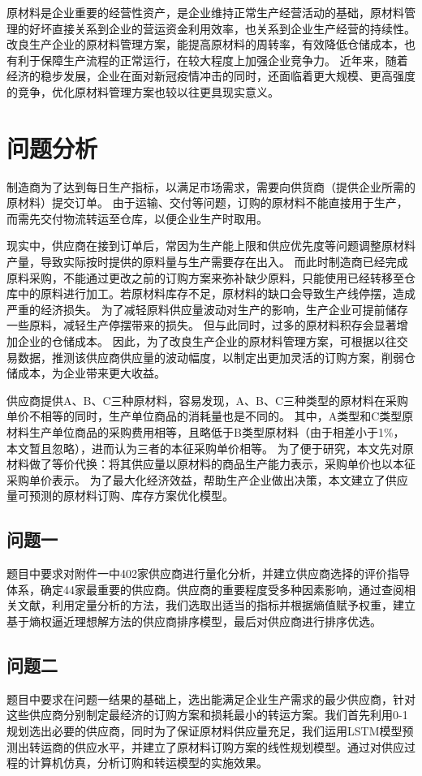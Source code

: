 
原材料是企业重要的经营性资产，是企业维持正常生产经营活动的基础，原材料管理的好坏直接关系到企业的营运资金利用效率，也关系到企业生产经营的持续性\cite{杨庆军2012浅谈}。
改良生产企业的原材料管理方案，能提高原材料的周转率，有效降低仓储成本，也有利于保障生产流程的正常运行，在较大程度上加强企业竞争力\cite{李红燕2018论企业原材料的管理和研究}。
近年来，随着经济的稳步发展，企业在面对新冠疫情冲击的同时，还面临着更大规模、更高强度的竞争，优化原材料管理方案也较以往更具现实意义。%

\section{问题分析}
制造商为了达到每日生产指标，以满足市场需求，需要向供货商（提供企业所需的原材料）提交订单。
由于运输、交付等问题，订购的原材料不能直接用于生产，而需先交付物流转运至仓库，以便企业生产时取用。

现实中，供应商在接到订单后，常因为生产能上限和供应优先度等问题调整原材料产量，导致实际按时提供的原料量与生产需要存在出入。
而此时制造商已经完成原料采购，不能通过更改之前的订购方案来弥补缺少原料，只能使用已经转移至仓库中的原料进行加工。若原材料库存不足，原材料的缺口会导致生产线停摆，造成严重的经济损失。
为了减轻原料供应量波动对生产的影响，生产企业可提前储存一些原料，减轻生产停摆带来的损失。
但与此同时，过多的原材料积存会显著增加企业的仓储成本。
因此，为了改良生产企业的原材料管理方案，可根据以往交易数据，推测该供应商供应量的波动幅度，以制定出更加灵活的订购方案，削弱仓储成本，为企业带来更大收益。

供应商提供A、B、C三种原材料，容易发现，A、B、C三种类型的原材料在采购单价不相等的同时，生产单位商品的消耗量也是不同的。
其中，A类型和C类型原材料生产单位商品的采购费用相等，且略低于B类型原材料（由于相差小于1\%，本文暂且忽略），进而认为三者的本征采购单价相等。
为了便于研究，本文先对原材料做了等价代换：将其供应量以原材料的商品生产能力表示，采购单价也以本征采购单价表示。
为了最大化经济效益，帮助生产企业做出决策，本文建立了供应量可预测的原材料订购、库存方案优化模型。

\subsection{问题一}
题目中要求对附件一中402家供应商进行量化分析，并建立供应商选择的评价指导体系，确定44家最重要的供应商。供应商的重要程度受多种因素影响，通过查阅相关文献，利用定量分析的方法，我们选取出适当的指标并根据熵值赋予权重，建立基于熵权逼近理想解方法的供应商排序模型，最后对供应商进行排序优选。


\subsection{问题二}
题目中要求在问题一结果的基础上，选出能满足企业生产需求的最少供应商，针对这些供应商分别制定最经济的订购方案和损耗最小的转运方案。我们首先利用0-1规划选出必要的供应商，同时为了保证原材料供应量充足，我们运用LSTM模型预测出转运商的供应水平，并建立了原材料订购方案的线性规划模型。通过对供应过程的计算机仿真，分析订购和转运模型的实施效果。

